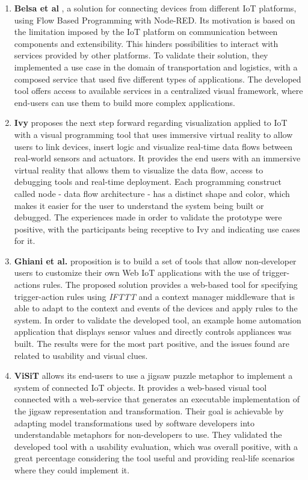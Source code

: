\begin{enumerate}
    \item \textbf{Belsa et al} \cite{Belsa2018}, a solution for connecting devices from different IoT platforms, using Flow Based Programming with Node-RED. Its motivation is based on the limitation imposed by the IoT platform on communication between components and extensibility. This hinders possibilities to interact with services provided by other platforms. To validate their solution, they implemented a use case in the domain of transportation and logistics, with a composed service that used five different types of applications. The developed tool offers access to available services in a centralized visual framework, where end-users can use them to build more complex applications.
    \item \textbf{Ivy} \cite{ivy} proposes the next step forward regarding visualization applied to IoT with a visual programming tool that uses immersive virtual reality to allow users to link devices, insert logic and visualize real-time data flows between real-world sensors and actuators. It provides the end users with an immersive virtual reality that allows them to visualize the data flow, access to debugging tools and real-time deployment. Each programming construct called node - data flow architecture - has a distinct shape and color, which makes it easier for the user to understand the system being built or debugged. The experiences made in order to validate the prototype were positive, with the participants being receptive to Ivy and indicating use cases for it.
    \item \textbf{Ghiani et al.} \cite{personalization_of_context_dependent_apps} proposition is to build a set of tools that allow non-developer users to customize their own Web IoT applications with the use of trigger-actions rules. The proposed solution provides a web-based tool for specifying trigger-action rules using \textit{IFTTT} and a context manager middleware that is able to adapt to the context and events of the devices and apply rules to the system. In order to validate the developed tool, an example home automation application that displays sensor values and directly controls appliances was built. The results were for the most part positive, and the issues found are related to usability and visual clues.
    \item \textbf{ViSiT} \cite{visit} allows its end-users to use a jigsaw puzzle metaphor to implement a system of connected IoT objects. It provides a web-based visual tool connected with a web-service that generates an executable implementation of the jigsaw representation and transformation. Their goal is achievable by adapting model transformations used by software developers into understandable metaphors for non-developers to use. They validated the developed tool with a usability evaluation, which was overall positive, with a great percentage considering the tool useful and providing real-life scenarios where they could implement it.

\end{enumerate}
